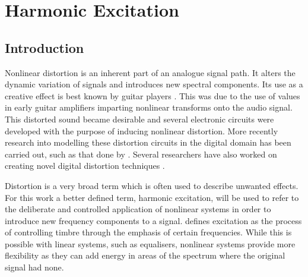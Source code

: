 \chapter{Harmonic Excitation}
\label{chap:Excitation}

\section{Introduction}
\label{sec:Excitation-Introduction}
	Nonlinear distortion is an inherent part of an analogue signal path. It alters the dynamic variation of signals and
	introduces new spectral components. Its use as a creative effect is best known by guitar players
	\citep{dutilleux2011nonlinear}. This was due to the use of values in early guitar amplifiers imparting nonlinear
	transforms onto the audio signal. This distorted sound became desirable and several electronic circuits were
	developed with the purpose of inducing nonlinear distortion. More recently research into modelling these distortion
	circuits in the digital domain has been carried out, such as that done by \citet{pakarinen2009a}. Several
	researchers have also worked on creating novel digital distortion techniques \citep{fernandez-cid2001distortion,
	pekonen2008coefficient, puckette2007patch}.

	Distortion is a very broad term which is often used to describe unwanted effects. For this work a better
	defined term, harmonic excitation, will be used to refer to the deliberate and controlled application of nonlinear
	systems in order to introduce new frequency components to a signal. \citet{dutilleux2011nonlinear} defines
	excitation as the process of controlling timbre through the emphasis of certain frequencies. While this is possible
	with linear systems, such as equalisers, nonlinear systems provide more flexibility as they can add energy in areas
	of the spectrum where the original signal had none.


